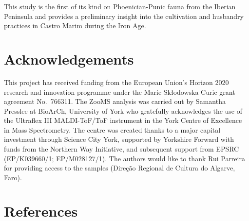 \documentclass[preprint, 3p, authoryear]{elsarticle} %
\begin{document}
This study is the first of its kind on Phoenician-Punic fauna from the Iberian Peninsula and provides a preliminary insight into the cultivation and husbandry practices in Castro Marim during the Iron Age.

\hypertarget{acknowledgements}{%
\section{Acknowledgements}\label{acknowledgements}}

This project has received funding from the European Union's Horizon 2020 research and innovation programme under the Marie Skłodowska-Curie grant agreement No.~766311. The ZooMS analysis was carried out by Samantha Presslee at BioArCh, University of York who gratefully acknowledges the use of the Ultraflex III MALDI-ToF/ToF instrument in the York Centre of Excellence in Mass Spectrometry. The centre was created thanks to a major capital investment through Science City York, supported by Yorkshire Forward with funds from the Northern Way Initiative, and subsequent support from EPSRC (EP/K039660/1; EP/M028127/1). The authors would like to thank Rui Parreira for providing access to the samples (Direção Regional de Cultura do Algarve, Faro).

\hypertarget{references}{%
\section*{References}\label{references}}
\end{document}

